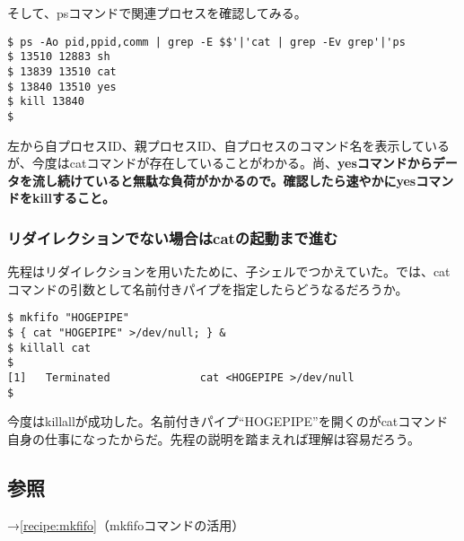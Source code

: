 そして、psコマンドで関連プロセスを確認してみる。

\begin{screen}
	\verb!$ ps -Ao pid,ppid,comm | grep -E $$'|'cat | grep -Ev grep'|'ps! \return \\
	\verb|$ 13510 12883 sh| \\
	\verb|$ 13839 13510 cat| \\
	\verb|$ 13840 13510 yes| \\
	\verb|$ kill 13840| \return \\
	\verb|$ |
\end{screen}

左から自プロセスID、親プロセスID、自プロセスのコマンド名を表示しているが、今度はcatコマンドが存在していることがわかる。尚、\textbf{yesコマンドからデータを流し続けていると無駄な負荷がかかるので。確認したら速やかにyesコマンドをkillすること。}

\subsubsection*{リダイレクションでない場合はcatの起動まで進む}

先程はリダイレクションを用いたために、子シェルでつかえていた。では、catコマンドの引数として名前付きパイプを指定したらどうなるだろうか。

\begin{screen}
	\verb|$ mkfifo "HOGEPIPE"| \return \\
	\verb|$ { cat "HOGEPIPE" >/dev/null; } &| \return \\
	\verb|$ killall cat| \return \\
	\verb|$ | \return \\
	\verb|[1]   Terminated              cat <HOGEPIPE >/dev/null| \\
	\verb|$ |
\end{screen}

今度はkillallが成功した。名前付きパイプ``HOGEPIPE''を開くのがcatコマンド自身の仕事になったからだ。先程の説明を踏まえれば理解は容易だろう。

\subsection*{参照}

\noindent
→\ref{recipe:mkfifo}（mkfifoコマンドの活用）
